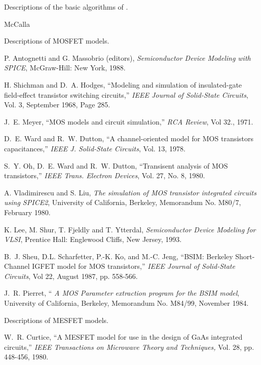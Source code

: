 Descriptions of the basic algorithms of \Spice.
\begin{thebibliography}{999}
McCalla

Descriptions of MOSFET models.

P. Antognetti and G. Massobrio (editors),
{\it Semiconductor Device Modeling with SPICE}, McGraw-Hill: New York,
1988.

H. Shichman and D.~A. Hodges, ``Modeling and simulation of insulated-gate
field-effect transistor switching circuits,''
{\it IEEE Journal of Solid-State Circuits}, Vol. 3, September 1968, Page 285.

J.~E. Meyer, ``MOS models and circuit simulation,''
{\it RCA Review}, Vol 32., 1971.

D.~E. Ward and R.~W. Dutton, ``A channel-oriented model for MOS transistors
capacitances,'' {\it IEEE J. Solid-State Circuits}, Vol. 13, 1978.

S.~Y. Oh, D.~E. Ward and R.~W. Dutton,
``Transisent analysis of MOS transistors,''
{\it IEEE Trans. Electron Devices}, Vol. 27, No. 8, 1980.

A. Vladimirescu and S. Liu, {\it The simulation of MOS transistor integrated
circuits using SPICE2},
University of California, Berkeley,
Memorandum No. M80/7, February 1980.

K. Lee, M. Shur, T. Fjeldly and T. Ytterdal, {\it Semiconductor Device
Modeling for VLSI}, Prentice Hall: Englewood Cliffs, New Jersey, 1993.


B.~J. Sheu, D.L. Scharfetter, P.-K. Ko, and M.-C. Jeng, ``BSIM:
Berkeley Short-Channel IGFET model for MOS transistors,''
{\it IEEE Journal of Solid-State Circuits}, Vol 22, August 1987, pp. 558-566.

J.~R. Pierret, `` {\it A MOS Parameter extraction program for the BSIM model},
University of California, Berkeley,
Memorandum No. M84/99, November 1984.


Descriptions of MESFET models.

W.~R. Curtice, ``A MESFET model for use in the design of GaAs integrated
circuits,'' {\it IEEE Transactions on Microwave Theory and Techniques,}
Vol. 28, pp. 448-456, 1980.


\end{thebibliography}
